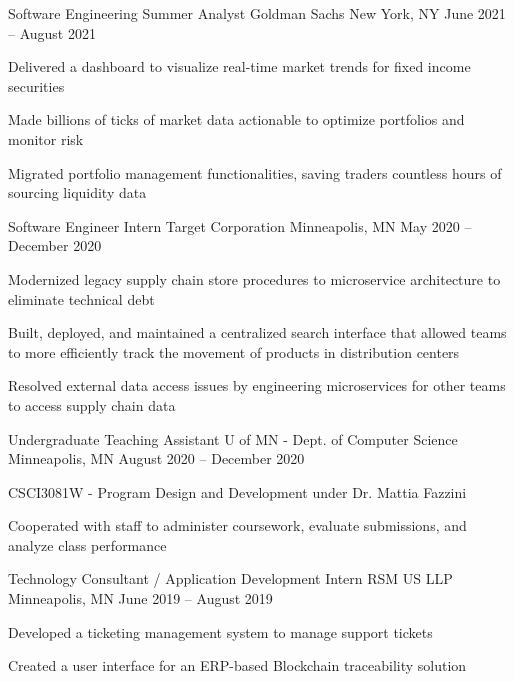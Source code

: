 \documentclass[]{awesome-cv}
\begin{document}
\vspace{-9mm}
\begin{cventries}
    \cventry
	{Software Engineering Summer Analyst}
	{Goldman Sachs}
	{New York, NY}
	{June 2021 – August 2021}
	{\begin{cvitems}
		\item {Delivered a dashboard to visualize real-time market trends for fixed income securities}
		\item {Made billions of ticks of market data actionable to optimize portfolios and monitor risk}
		\item {Migrated portfolio management functionalities, saving traders countless hours of sourcing liquidity data}
		\end{cvitems}}
	\cventry
	{Software Engineer Intern}
	{Target Corporation}
	{Minneapolis, MN}
	{May 2020 – December 2020}
	{\begin{cvitems}
		\item {Modernized legacy supply chain store procedures to microservice architecture to eliminate technical debt}
		\item {Built, deployed, and maintained a centralized search interface that allowed teams to more efficiently track the movement of products in distribution centers}
		\item {Resolved external data access issues by engineering microservices for other teams to access supply chain data}
		\end{cvitems}}
	\cventry
	{Undergraduate Teaching Assistant}
	{U of MN - Dept. of Computer Science}
	{Minneapolis, MN}
	{August 2020 – December 2020}
	{\begin{cvitems}
    	\item {CSCI3081W - Program Design and Development under Dr. Mattia Fazzini}
		\item {Cooperated with staff to administer coursework, evaluate submissions, and analyze class performance}
		\end{cvitems}}
	\cventry
	{Technology Consultant / Application Development Intern}
	{RSM US LLP}
	{Minneapolis, MN}
	{June 2019 – August 2019}
	{\begin{cvitems}
		\item {Developed a ticketing management system to manage support tickets}
		\item {Created a user interface for an ERP-based Blockchain traceability solution}
		\end{cvitems}}

\end{cventries}
\end{document}
